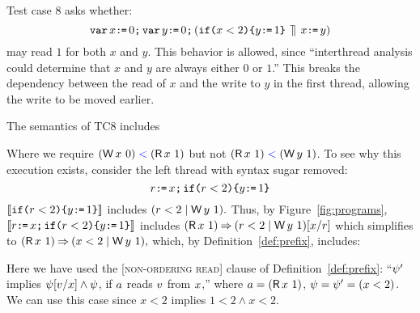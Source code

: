 Test case 8 asks whether:
\begin{displaymath}
  \texttt{var}\, x\texttt{:}\mkern-1mu\texttt{=}\, 0\texttt{;}\,
  \texttt{var}\, y\texttt{:}\mkern-1mu\texttt{=}\, 0\texttt{;}\,
  (\texttt{if}\allowbreak\texttt{(}x<2\texttt{)}\allowbreak\texttt{\{} y\texttt{:}\mkern-1mu\texttt{=}\, 1\texttt{\}} 
  \,\mathbin{\rrceil}\,
  x\texttt{:}\mkern-1mu\texttt{=}\, y)
\end{displaymath}
may read $1$ for both $x$ and $y$.  This behavior is allowed, since
``interthread analysis could determine that $x$ and $y$ are always either $0$
or $1$.''  This breaks the dependency between the read of $x$ and the write
to $y$ in the first thread, allowing the write to be moved earlier.

The semantics of TC8 includes
\begin{tikzdisplay}[node distance=1em]
\end{tikzdisplay}
Where we require $(\DW{x}{0})\lt(\DR{x}{1})$ but not $(\DR{x}{1})\lt(\DW{y}{1})$.
To see why this execution exists, consider the left thread with syntax sugar
removed:
\begin{displaymath}
  r\texttt{:}\mkern-1mu\texttt{=}\, x\texttt{;}\, \texttt{if}\allowbreak\texttt{(}r<2\texttt{)}\allowbreak\texttt{\{} y\texttt{:}\mkern-1mu\texttt{=}\, 1\texttt{\}}
\end{displaymath}
\begin{math}
  \llbracket\texttt{if}\allowbreak\texttt{(}r<2\texttt{)}\allowbreak\texttt{\{} y\texttt{:}\mkern-1mu\texttt{=}\, 1\texttt{\}}\rrbracket
\end{math}
includes
\begin{math}
  (r<2\mid\DW{y}{1}).
\end{math}
Thus, by Figure~\ref{fig:programs}, 
\begin{math}
  \llbracket r\texttt{:}\mkern-1mu\texttt{=}\, x\texttt{;}\, \texttt{if}\allowbreak\texttt{(}r<2\texttt{)}\allowbreak\texttt{\{} y\texttt{:}\mkern-1mu\texttt{=}\, 1\texttt{\}}\rrbracket
\end{math}
includes
\begin{math}
  (\DR{x}{1}) \prefix (r<2\mid\DW{y}{1})[x/r]
\end{math}
which simplifies to
\begin{math}
  (\DR{x}{1}) \prefix (x<2\mid\DW{y}{1}),
\end{math}
which, by Definition~\ref{def:prefix}, includes:
\begin{tikzdisplay}[node distance=1em,baselinecenter]
  \end{tikzdisplay}
Here we have used the \textsc{[non-ordering read]} clause of Definition~\ref{def:prefix}:
``$\psi'$ implies $\psi[v/x] \land \psi$, if $a$ reads $v$ from $x$,''
where $a=(\DR{x}{1})$,  $\psi=\psi'=(x<2)$.  We can use this case since
$x<2$ implies $1<2\land x<2$.

